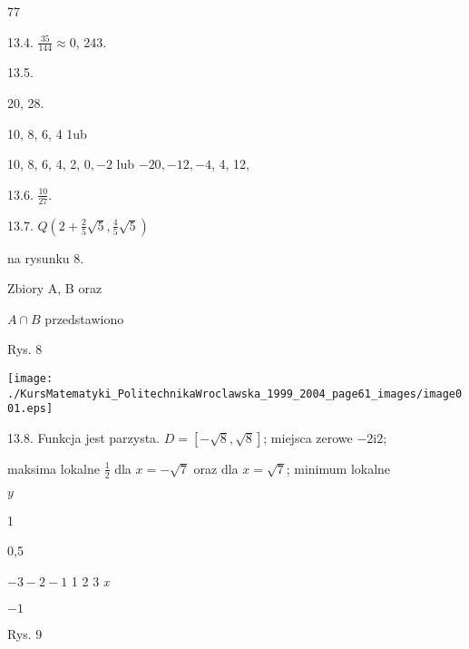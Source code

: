 \documentclass[a4paper,12pt]{article}
\begin{document}
77

13.4. $\displaystyle \frac{35}{144}\approx 0$, 243.

13.5.

20, 28.

10, 8, 6, 4 1ub

10, 8, 6, 4, 2, $0, -2$ lub $-20, -12, -4$, 4, 12,

13.6. $\displaystyle \frac{10}{27}.$

13.7. $Q(2+\displaystyle \frac{2}{5}\sqrt{5},\frac{4}{5}\sqrt{5})$

na rysunku 8.

Zbiory A, B oraz

$A\cap B$ przedstawiono

Rys. 8
\begin{center}
\texttt{[image: ./KursMatematyki\_PolitechnikaWroclawska\_1999\_2004\_page61\_images/image001.eps]}
\end{center}
13.8. Funkcja jest parzysta. $D = [-\sqrt{8},\sqrt{8}]$; miejsca zerowe $-2\mathrm{i}2$;

maksima lokalne $\displaystyle \frac{1}{2}$ dla $x = -\sqrt{7}$ oraz dla $x = \sqrt{7}$; minimum lokalne

$y$

1

0,5

$-3  -2  -1$  1 2  3  {\it x}

$-1$

Rys. 9
\end{document}
